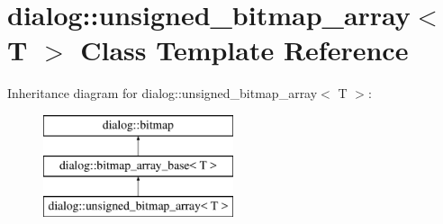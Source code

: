 \hypertarget{classdialog_1_1unsigned__bitmap__array}{}\section{dialog\+:\+:unsigned\+\_\+bitmap\+\_\+array$<$ T $>$ Class Template Reference}
\label{classdialog_1_1unsigned__bitmap__array}
Inheritance diagram for dialog\+:\+:unsigned\+\_\+bitmap\+\_\+array$<$ T $>$\+:\begin{figure}[H]
\begin{center}
\leavevmode
\includegraphics[height=3.000000cm]{classdialog_1_1unsigned__bitmap__array}
\end{center}
\end{figure}
